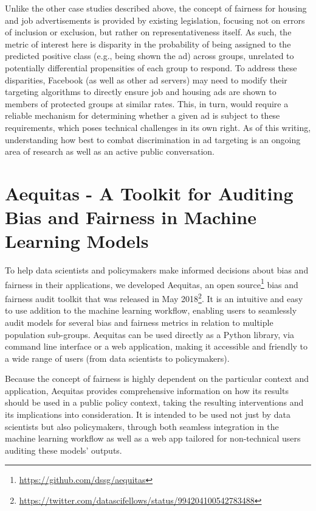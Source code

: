 \documentclass[]{krantz}
\begin{document}
Unlike the other case studies described above, the concept of fairness
for housing and job advertisements is provided by existing legislation,
focusing not on errors of inclusion or exclusion, but rather on
representativeness itself. As such, the metric of interest here is
disparity in the probability of being assigned to the predicted positive
class (e.g., being shown the ad) across groups, unrelated to potentially
differential propensities of each group to respond. To address these
disparities, Facebook (as well as other ad servers) may need to modify
their targeting algorithms to directly ensure job and housing ads are
shown to members of protected groups at similar rates. This, in turn,
would require a reliable mechanism for determining whether a given ad is
subject to these requirements, which poses technical challenges in its
own right. As of this writing, understanding how best to combat
discrimination in ad targeting is an ongoing area of research as well as
an active public conversation.

\section{Aequitas - A Toolkit for Auditing Bias and Fairness in Machine
Learning
Models}\label{aequitas---a-toolkit-for-auditing-bias-and-fairness-in-machine-learning-models}

To help data scientists and policymakers make informed decisions about
bias and fairness in their applications, we developed Aequitas, an open
source\footnote{\url{https://github.com/dssg/aequitas}} bias and
fairness audit toolkit that was released in May 2018\footnote{\url{https://twitter.com/datascifellows/status/994204100542783488}}.
It is an intuitive and easy to use addition to the machine learning
workflow, enabling users to seamlessly audit models for several bias and
fairness metrics in relation to multiple population sub-groups. Aequitas
can be used directly as a Python library, via command line interface or
a web application, making it accessible and friendly to a wide range of
users (from data scientists to policymakers).

Because the concept of fairness is highly dependent on the particular
context and application, Aequitas provides comprehensive information on
how its results should be used in a public policy context, taking the
resulting interventions and its implications into consideration. It is
intended to be used not just by data scientists but also policymakers,
through both seamless integration in the machine learning workflow as
well as a web app tailored for non-technical users auditing these
models' outputs.
\end{document}
